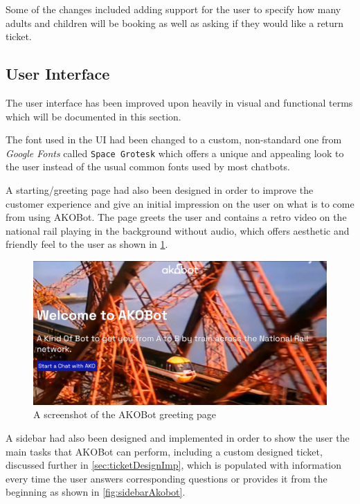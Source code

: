 \documentclass[11pt]{article}
\newcommand{\code}[1]{{\texttt{#1}}}
\begin{document}
Some of the changes included adding support for the user to specify how many adults and children will be booking as well as asking if they would like a return ticket.

    \subsection{User Interface}
    The user interface has been improved upon heavily in visual and functional terms which will be documented in this section.

    The font used in the UI had been changed to a custom, non-standard one from \textit{Google Fonts} called \code{Space Grotesk} which offers a unique and appealing look to the user instead of the usual common fonts used by most chatbots.

    A starting/greeting page had also been designed in order to improve the customer experience and give an initial impression on the user on what is to come from using AKOBot. The page greets the user and contains a retro video on the national rail playing in the background without audio, which offers aesthetic and friendly feel to the user as shown in \cref{fig:akobotintro}.


\begin{figure}[!ht]
    \centering
    \includegraphics[width=.75\textwidth]{AkobotUIIntro1.png}
    \caption{A screenshot of the AKOBot greeting page}
    \label{fig:akobotintro}
\end{figure}

    A sidebar had also been designed and implemented in order to show the user the main tasks that AKOBot can perform, including a custom designed ticket, discussed further in \cref{sec:ticketDesignImp}, which is populated with information every time the user answers corresponding questions or provides it from the beginning as shown in \cref{fig:sidebarAkobot}.
        
        
        

    
\end{document}
